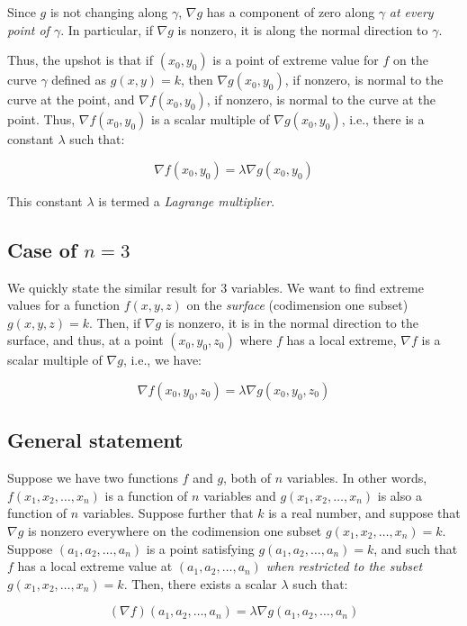 \documentclass[10pt]{amsart}
\begin{document}
Since $g$ is not changing along $\gamma$, $\nabla g$ has a component
of zero along $\gamma$ {\em at every point of $\gamma$}. In particular,
if $\nabla g$ is nonzero, it is along the normal direction to
$\gamma$.

Thus, the upshot is that if $(x_0,y_0)$ is a point of extreme value
for $f$ on the curve $\gamma$ defined as $g(x,y) = k$, then $\nabla
g(x_0,y_0)$, if nonzero, is normal to the curve at the point, and
$\nabla f(x_0,y_0)$, if nonzero, is normal to the curve at the
point. Thus, $\nabla f (x_0,y_0)$ is a scalar multiple of $\nabla
g(x_0,y_0)$, i.e., there is a constant $\lambda$ such that:

$$\nabla f(x_0,y_0) = \lambda \nabla g(x_0,y_0)$$

This constant $\lambda$ is termed a {\em Lagrange multiplier}.

\subsection{Case of $n = 3$}

We quickly state the similar result for $3$ variables. We want to find
extreme values for a function $f(x,y,z)$ on the {\em surface}
(codimension one subset) $g(x,y,z) = k$. Then, if $\nabla g$ is
nonzero, it is in the normal direction to the surface, and thus, at a
point $(x_0,y_0,z_0)$ where $f$ has a local extreme, $\nabla f$ is a
scalar multiple of $\nabla g$, i.e., we have:

$$\nabla f(x_0,y_0,z_0) = \lambda \nabla g(x_0,y_0,z_0)$$

\subsection{General statement}

Suppose we have two functions $f$ and $g$, both of $n$ variables. In
other words, $f(x_1,x_2, \dots, x_n)$ is a function of $n$ variables
and $g(x_1,x_2,\dots,x_n)$ is also a function of $n$
variables. Suppose further that $k$ is a real number, and suppose that
$\nabla g$ is nonzero everywhere on the codimension one subset
$g(x_1,x_2,\dots,x_n) = k$. Suppose $(a_1,a_2,\dots,a_n)$ is a point
satisfying $g(a_1,a_2,\dots,a_n) = k$, and such that $f$ has a local
extreme value at $(a_1,a_2,\dots,a_n)$ {\em when restricted to the
subset} $g(x_1,x_2,\dots,x_n) = k$. Then, there exists a scalar
$\lambda$ such that:

$$(\nabla f)(a_1,a_2,\dots,a_n) = \lambda \nabla g(a_1,a_2,\dots,a_n)$$
\end{document}
